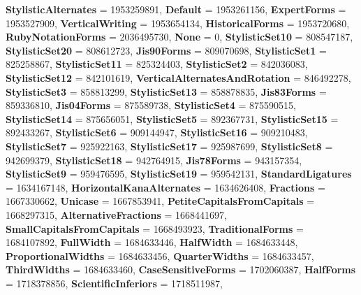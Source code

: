 \begin{DoxyCompactItemize}
{\bfseries Stylistic\+Alternates} = 1953259891, 
{\bfseries Default} = 1953261156, 
{\bfseries Expert\+Forms} = 1953527909, 
{\bfseries Vertical\+Writing} = 1953654134, 
\newline
{\bfseries Historical\+Forms} = 1953720680, 
{\bfseries Ruby\+Notation\+Forms} = 2036495730, 
{\bfseries None} = 0, 
{\bfseries Stylistic\+Set10} = 808547187, 
\newline
{\bfseries Stylistic\+Set20} = 808612723, 
{\bfseries Jis90\+Forms} = 809070698, 
{\bfseries Stylistic\+Set1} = 825258867, 
{\bfseries Stylistic\+Set11} = 825324403, 
\newline
{\bfseries Stylistic\+Set2} = 842036083, 
{\bfseries Stylistic\+Set12} = 842101619, 
{\bfseries Vertical\+Alternates\+And\+Rotation} = 846492278, 
{\bfseries Stylistic\+Set3} = 858813299, 
\newline
{\bfseries Stylistic\+Set13} = 858878835, 
{\bfseries Jis83\+Forms} = 859336810, 
{\bfseries Jis04\+Forms} = 875589738, 
{\bfseries Stylistic\+Set4} = 875590515, 
\newline
{\bfseries Stylistic\+Set14} = 875656051, 
{\bfseries Stylistic\+Set5} = 892367731, 
{\bfseries Stylistic\+Set15} = 892433267, 
{\bfseries Stylistic\+Set6} = 909144947, 
\newline
{\bfseries Stylistic\+Set16} = 909210483, 
{\bfseries Stylistic\+Set7} = 925922163, 
{\bfseries Stylistic\+Set17} = 925987699, 
{\bfseries Stylistic\+Set8} = 942699379, 
\newline
{\bfseries Stylistic\+Set18} = 942764915, 
{\bfseries Jis78\+Forms} = 943157354, 
{\bfseries Stylistic\+Set9} = 959476595, 
{\bfseries Stylistic\+Set19} = 959542131, 
\newline
{\bfseries Standard\+Ligatures} = 1634167148, 
{\bfseries Horizontal\+Kana\+Alternates} = 1634626408, 
{\bfseries Fractions} = 1667330662, 
{\bfseries Unicase} = 1667853941, 
\newline
{\bfseries Petite\+Capitals\+From\+Capitals} = 1668297315, 
{\bfseries Alternative\+Fractions} = 1668441697, 
{\bfseries Small\+Capitals\+From\+Capitals} = 1668493923, 
{\bfseries Traditional\+Forms} = 1684107892, 
\newline
{\bfseries Full\+Width} = 1684633446, 
{\bfseries Half\+Width} = 1684633448, 
{\bfseries Proportional\+Widths} = 1684633456, 
{\bfseries Quarter\+Widths} = 1684633457, 
\newline
{\bfseries Third\+Widths} = 1684633460, 
{\bfseries Case\+Sensitive\+Forms} = 1702060387, 
{\bfseries Half\+Forms} = 1718378856, 
{\bfseries Scientific\+Inferiors} = 1718511987, 

\end{DoxyCompactItemize}
